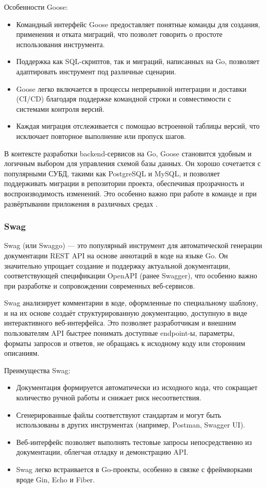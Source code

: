 \documentclass[diploma]{SCWorks}
\begin{document}
Особенности Goose:
\begin{itemize}
    \item Командный интерфейс Goose 
    предоставляет понятные команды для создания, применения и отката миграций, 
    что позволет говорить о простоте использования инструмента.
    \item Поддержка как SQL-скриптов, так и миграций, написанных на Go, 
    позволяет адаптировать инструмент под различные сценарии.
    \item Goose легко включается в процессы непрерывной интеграции и 
    доставки (CI/CD) благодаря поддержке командной строки и совместимости с 
    системами контроля версий.
    \item Каждая миграция отслеживается с помощью встроенной таблицы 
    версий, что исключает повторное выполнение или пропуск шагов.
\end{itemize}

В контексте разработки backend-сервисов на Go, Goose становится удобным и 
логичным выбором для управления схемой базы данных. Он хорошо сочетается с 
популярными СУБД, такими как PostgreSQL и MySQL, и позволяет поддерживать 
миграции в репозитории проекта, обеспечивая прозрачность и воспроизводимость 
изменений. Это особенно важно при работе в команде и при развёртывании 
приложения в различных средах \cite{goose}.

\subsubsection{Swag}

Swag (или Swaggo) — это популярный инструмент для автоматической генерации 
документации REST API на основе аннотаций в коде на языке Go. Он значительно 
упрощает создание и поддержку актуальной документации, соответствующей 
спецификации OpenAPI (ранее Swagger), что особенно важно при разработке и 
сопровождении современных веб-сервисов.

Swag анализирует комментарии в коде, оформленные по специальному шаблону, и на 
их основе создаёт структурированную документацию, доступную в виде 
интерактивного веб-интерфейса. Это позволяет разработчикам и внешним 
пользователям API быстрее понимать доступные endpoint-ы, параметры, 
форматы запросов и ответов, не обращаясь к исходному коду или сторонним 
описаниям.

Преимущества Swag:
\begin{itemize}
    \item Документация формируется автоматически из исходного кода, что 
    сокращает количество ручной работы и снижает риск несоответствия.
    \item Сгенерированные файлы соответствуют стандартам и могут быть 
    использованы в других инструментах (например, Postman, Swagger UI).
    \item Веб-интерфейс позволяет выполнять тестовые запросы непосредственно 
    из документации, облегчая отладку и демонстрацию API.
    \item Swag легко встраивается в Go-проекты, особенно в связке с 
    фреймворками вроде Gin, Echo и Fiber.
\end{itemize}
\end{document}
